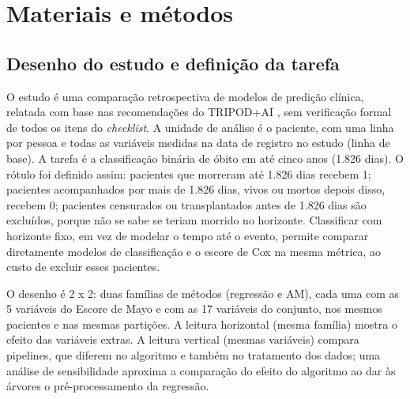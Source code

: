 \section{Materiais e métodos}\label{sec:metodos}

\subsection{Desenho do estudo e definição da tarefa}
O estudo é uma comparação retrospectiva de modelos de predição clínica, relatada com base nas recomendações do TRIPOD+AI \cite{collins2024tripodai}, sem verificação formal de todos os itens do \textit{checklist}. A unidade de análise é o paciente, com uma linha por pessoa e todas as variáveis medidas na data de registro no estudo (linha de base). A tarefa é a classificação binária de óbito em até cinco anos (1.826 dias). O rótulo foi definido assim: pacientes que morreram até 1.826 dias recebem 1; pacientes acompanhados por mais de 1.826 dias, vivos ou mortos depois disso, recebem 0; pacientes censurados ou transplantados antes de 1.826 dias são excluídos, porque não se sabe se teriam morrido no horizonte. Classificar com horizonte fixo, em vez de modelar o tempo até o evento, permite comparar diretamente modelos de classificação e o escore de Cox na mesma métrica, ao custo de excluir esses pacientes.

O desenho é 2 x 2: duas famílias de métodos (regressão e AM), cada uma com as 5 variáveis do Escore de Mayo e com as 17 variáveis do conjunto, nos mesmos pacientes e nas mesmas partições. A leitura horizontal (mesma família) mostra o efeito das variáveis extras. A leitura vertical (mesmas variáveis) compara pipelines, que diferem no algoritmo e também no tratamento dos dados; uma análise de sensibilidade aproxima a comparação do efeito do algoritmo ao dar às árvores o pré-processamento da regressão.

